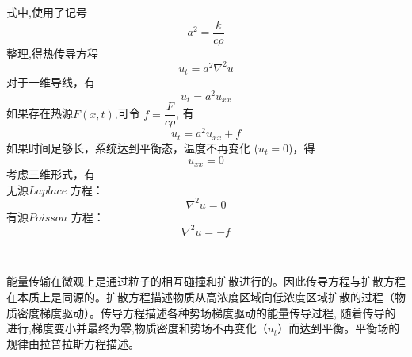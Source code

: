式中,使用了记号 $$ a^2 = \dfrac{k}{c\rho}$$
整理,得热传导方程
\begin{equation}\label{eq:heat}
	\boxed{u_t = a^2 \nabla ^2 u } 
\end{equation}
对于一维导线，有
$$ u_t= a^2 u_{xx}$$ 
如果存在热源$F(x,t)$,可令 $f=\dfrac{F}{c\rho}$, 有	$$ u_t= a^2 u_{xx}+f$$ 
如果时间足够长，系统达到平衡态，温度不再变化 ($u_t =0$)，得 \\ 
$$ u_{xx}=0$$ 
考虑三维形式，有\\
无源$Laplace$ 方程： $$  \nabla ^2 u =0$$ 
有源$Poisson$ 方程： $$  \nabla ^2 u =-f$$    


~~\\ 
\begin{hint}
	能量传输在微观上是通过粒子的相互碰撞和扩散进行的。因此传导方程与扩散方程在本质上是同源的。扩散方程描述物质从高浓度区域向低浓度区域扩散的过程（物质密度梯度驱动）。传导方程描述各种势场梯度驱动的能量传导过程, 随着传导的进行,梯度变小并最终为零,物质密度和势场不再变化（$u_t$）而达到平衡。平衡场的规律由拉普拉斯方程描述。
\end{hint}

